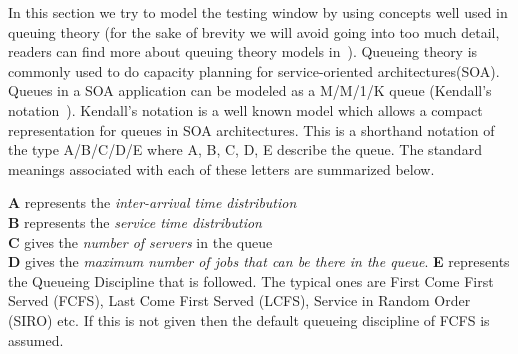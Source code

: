 In this section we try to model the testing window by using concepts well used in queuing theory (for the sake of brevity we will avoid going into too much detail, readers can find more about queuing theory models in~\cite{queueBook}).
Queueing theory is commonly used to do capacity planning for service-oriented architectures(SOA).
Queues in a SOA application can be modeled as a M/M/1/K queue (Kendall's notation~\cite{kendall}).
Kendall's notation is a well known model which allows a compact representation for queues in SOA architectures.
This is a shorthand notation of the type A/B/C/D/E where A, B, C, D, E describe the queue.
The standard meanings associated with each of these letters are summarized below.\\

\begin{framed}
	\noindent \textbf{A} represents the \emph{inter-arrival time distribution}\\
	\textbf{B} represents the \emph{service time distribution}\\
	\textbf{C} gives the \emph{number of servers} in the queue\\
	\textbf{D} gives the \emph{maximum number of jobs that can be there in the queue}.
	\textbf{E} represents the Queueing Discipline that is followed. The typical ones are First Come First Served (FCFS), Last Come First Served (LCFS), Service in Random Order (SIRO) etc. If this is not given then the default queueing discipline of FCFS is assumed.
\end{framed}

